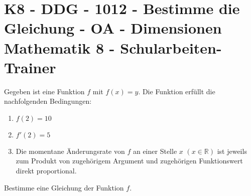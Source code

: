\section{K8 - DDG - 1012 - Bestimme die Gleichung - OA - Dimensionen Mathematik 8 - Schularbeiten-Trainer}

\begin{beispiel}[K8 - DDG]{1}
Gegeben ist eine Funktion $f$ mit $f(x)=y$. Die Funktion erfüllt die nachfolgenden Bedingungen:
\begin{enumerate}
	\item $f(2)=10$
	\item $f'(2)=5$
	\item Die momentane Änderungsrate von $f$ an einer Stelle $x$ $(x\in\mathbb{R})$ ist jeweils zum Produkt von zugehörigem Argument und zugehörigen Funktionswert direkt proportional.
\end{enumerate}

Bestimme eine Gleichung der Funktion $f$.

\end{beispiel}